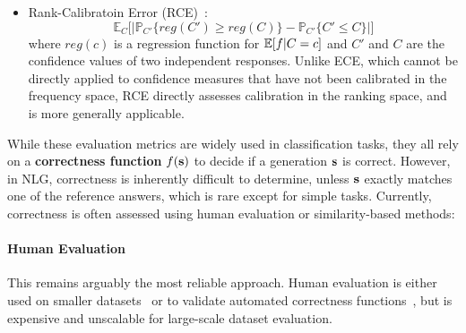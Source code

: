 \begin{itemize}[leftmargin=*, nosep]
    \item Rank-Calibratoin Error (RCE)~\cite{RCEhuang2024}: 
    {\small
    \begin{equation}
        \mathbb{E}_C\Big[|\mathbb{P}_{C'}\{reg(C')\geq reg(C)\} - \mathbb{P}_{C'}\{C'\leq C\}|\Big]
    \end{equation}
    }
    where $reg(c)$ is a regression function for $\mathbb{E}[f|C=c]$ and $C'$ and $C$ are the confidence values of two independent responses.
    Unlike ECE, which cannot be directly applied to confidence measures that have not been calibrated in the frequency space, RCE directly assesses calibration in the ranking space, and is more generally applicable.
    
\end{itemize}


While these evaluation metrics are widely used in classification tasks, they all rely on a \textbf{correctness function} $f(\mathbf{s})$ to decide if a generation $\mathbf{s}$ is correct. 
However, in NLG, correctness is inherently difficult to determine, unless $\mathbf{s}$ exactly matches one of the reference answers, which is rare except for simple tasks.
Currently, correctness is often assessed using human evaluation or similarity-based methods:
\paragraph{Human Evaluation} This remains arguably the most reliable approach. 
    Human evaluation is either used on smaller datasets~\cite{MCConf-pmlr-v239-ren23a} or to validate automated correctness functions~\cite{kuhn2023semantic,lin2024generating,CSL}, but is expensive and unscalable for large-scale dataset evaluation.
    
